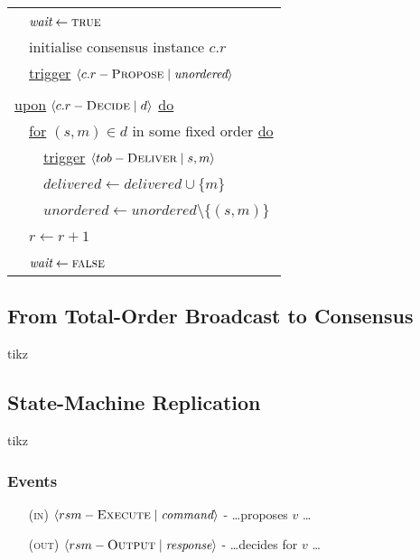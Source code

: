 \documentclass{article}
\begin{document}
\begin{adjustwidth}{2em}{2em}
\begin{adjustwidth}{2em}{2em}
\begin{center}
\begin{tabular}{l}
					\ \ $\textit{wait} \leftarrow \textsc{true}$ \\
					\ \ initialise consensus instance $c.r$ \\
					\ \ \underline{trigger} $\langle c.r-\textsc{Propose} \mid \textit{unordered} \rangle$ \\
					\\
					\underline{upon} $\langle c.r-\textsc{Decide} \mid d \rangle$ \underline{do} \\
					\ \ \underline{for} $(s,m) \in d$ in some fixed order \underline{do} \\
					\ \ \ \ \underline{trigger} $\langle tob-\textsc{Deliver} \mid s,m\rangle$ \\
					\ \ \ \ $\textit{delivered} \leftarrow \textit{delivered} \cup \{ m \}$ \\
					\ \ \ \ $\textit{unordered} \leftarrow \textit{unordered} \setminus \{ (s,m) \}$ \\
					\ \ $r \leftarrow r+1$ \\
					\ \ $\textit{wait} \leftarrow \textsc{false}$
				\end{tabular}
			\end{center}
		\end{adjustwidth}
		\subsection{From Total-Order Broadcast to Consensus}
		\begin{adjustwidth}{2em}{2em}
			tikz
		\end{adjustwidth}
		\subsection{State-Machine Replication}
		\begin{center}
			tikz
		\end{center}
		\begin{adjustwidth}{2em}{2em}
			\subsubsection{Events}
			\begin{adjustwidth}{2em}{}
				\begin{enumerate}
					\item[(\textsc{in})] $\langle rsm-\textsc{Execute} \mid \textit{command} \rangle$ - \ldots proposes $v$ \ldots
					\item[(\textsc{out})] $\langle rsm-\textsc{Output} \mid \textit{response} \rangle$ - \ldots decides for $v$ \ldots
				\end{enumerate}
			\end{adjustwidth}

\end{adjustwidth}
\end{adjustwidth}
\end{document}
